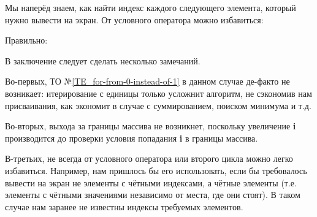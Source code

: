 \begin{typerror}
	Мы наперёд знаем, как найти индекс каждого следующего элемента,
	который нужно вывести на экран.
	От условного оператора можно избавиться:

	Правильно:

	В заключение следует сделать несколько замечаний.

	Во-первых, ТО №\ref{TE_for-from-0-instead-of-1} в данном случае
	де-факто не возникает:
	итерирование с единицы только усложнит алгоритм, не сэкономив нам присваивания,
	как экономит в случае с суммированием, поиском минимума и т.д.

	Во-вторых, выхода за границы массива не возникнет,
	поскольку увеличение \textbf{i} производится
	до проверки условия попадания \textbf{i} в границы массива.

	В-третьих, не всегда от условного оператора или второго цикла можно легко избавиться.
	Например, нам пришлось бы его использовать,
	если бы требовалось вывести на экран не элементы с чётными индексами,
	а чётные элементы (т.е. элементы с чётными значениями независимо от места, где они стоят).
	В таком случае нам заранее не известны индексы требуемых элементов.

\end{typerror}
